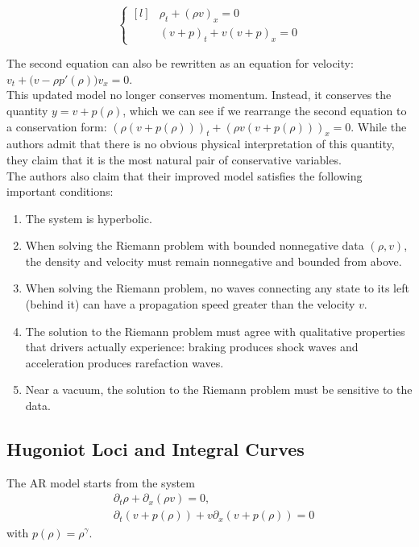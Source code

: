 \documentclass{article}
\begin{document}
\[ \left\{ \begin{matrix*}[l] & \rho_t + (\rho v)_x = 0 \\[1ex] & (v + p)_t + v (v + p)_x = 0 \end{matrix*} \right. \]

The second equation can also be rewritten as an equation for velocity: $v_t + \Big(v - \rho p'(\rho)\Big)v_x = 0$. \\

This updated model no longer conserves momentum.  Instead, it conserves the quantity $y = v + p(\rho)$, which we can see if we rearrange the second equation to a conservation form: $(\rho (v + p(\rho)))_t + (\rho v(v + p(\rho)))_x = 0$. While the authors admit that there is no obvious physical interpretation of this quantity, they claim that it is the most natural pair of conservative variables. \\

The authors also claim that their improved model satisfies the following important conditions:
\begin{enumerate}
\item The system is hyperbolic.
\item When solving the Riemann problem with bounded nonnegative data $(\rho, v)$, the density and velocity must remain nonnegative and bounded from above.
\item When solving the Riemann problem, no waves connecting any state to its left (behind it) can have a propagation speed greater than the velocity $v$.
\item The solution to the Riemann problem must agree with qualitative properties that drivers actually experience: braking produces shock waves and acceleration produces rarefaction waves.
\item Near a vacuum, the solution to the Riemann problem must be sensitive to the data.
\end{enumerate}

\subsection{Hugoniot Loci and Integral Curves}
The AR model starts from the system
\begin{align}
&\partial_t\rho + \partial_x(\rho v) = 0, \label{AR:eq1}\\
&\partial_t \left(v + p(\rho )\right) + v\partial_x \left( v + p(\rho )\right) = 0\label{AR:eq1.5}
\end{align}
with $p(\rho) = \rho^\gamma$.
\end{document}
